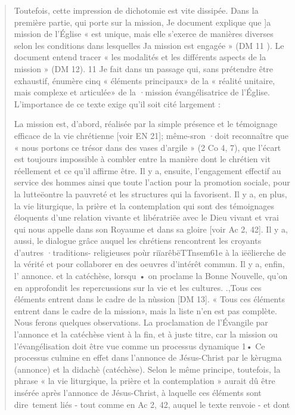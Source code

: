 \begin{quote}
Toutefois, cette impression de dichotomie est vite dissipée.
Dans la première partie, qui porte sur la mission, Je document
explique que ]a mission de l'Église « est unique, mais elle
s'exerce de manières diverses selon les conditions dans lesquelles
Ja mission est engagée » (DM 11 ). Le document entend
tracer « les modalités et les différents aspects de la mission »
(DM 12). 11 Je fait dans un passage qui, sans prétendre être
exhaustif, énumère cinq « éléments principaux» de la « réalité
unitaire, mais complexe et articulée» de la ·mission évangélisatrice
de l'Église. L'importance de ce texte exige qu'il soit
cité largement :
\begin{quote}
    
\end{quote}
La mission est, d'abord, réalisée par la simple présence et le
témoignage efficace de la vie chrétienne [voir EN 21]; même-sron
·doit reconnaître que « nous portons ce trésor dans des vases d'argile
» (2 Co 4, 7), que l'écart est toujours impossible à combler entre
la manière dont le chrétien vit réellement et ce qu'il affirme être.
Il y a, ensuite, l'engagement effectif au service des hommes ainsi
que toute l'action pour la promotion sociale, pour la lutteëontre la
pauvreté et les structures qui la favorisent.
Il y a, en plus, la vie liturgique, la prière et la contemplation qui
sont des témoignages éloquents d'une relation vivante et libératriëe
avec le Dieu vivant et vrai qui nous appelle dans son Royaume et
dans sa gloire [voir Ac 2, 42].
Il y a, aussi, le dialogue grâce auquel les chrétiens rencontrent les
croyants d'autres ·traditions- religieuses poùr riïarêbëTTnsem61e à la
iëëlierche de la vérité et pour collaborer en des oeuvres d'intérêt
commun.
Il y a, enfin, l' annonce. et la catéchèse, lorsqu • on proclame la
Bonne Nouvelle, qu'on en approfondit les repercussions sur la vie et
les cultures.
.,Tous ces éléments entrent dans le cadre de la nùssion [DM 13].
« Tous ces éléments entrent dans le cadre de la mission»,
mais la liste n'en est pas complète. Nous ferons quelques
observations. La proclamation de l'Évangile par l'annonce et
la catéchèse vient à la fin, et à juste titre, car la mission ou
l'évangélisation doit être vue comme un processus dynamique 1•
Ce processus culmine en effet dans l'annonce de Jésus-Christ
par le kèrugma (annonce) et la didachè (catéchèse). Selon le
même principe, toutefois, la phrase « la vie liturgique, la prière
et la contemplation » aurait dû être insérée après l'annonce de
Jésus-Christ, à laquelle ces éléments sont dire~tement liés
- tout comme en Ac 2, 42, auquel le texte renvoie - et dont

\end{quote}
